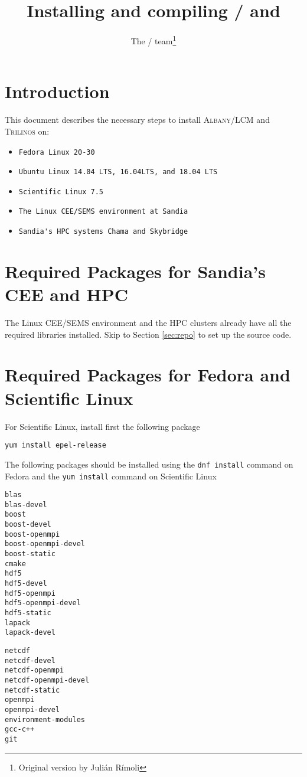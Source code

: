 \documentclass{article}
\title{Installing and compiling \albany{}/\lcm{} and
  \trilinos{}}
\author{The \albany{}/\lcm{} team\thanks{Original version by Juli\'an
    R\'imoli}}
\newcommand{\trilinos}{\textsc{Trilinos}}
\newcommand{\albany}{\textsc{Albany}}
\newcommand{\lcm}{\textsc{LCM}}
\begin{document}
\maketitle

\section{Introduction}
This document describes the necessary steps to install \albany{}/\lcm{} and
\trilinos{} on:
\begin{itemize}
\item \verb+Fedora Linux 20-30+
\item \verb+Ubuntu Linux 14.04 LTS, 16.04LTS, and 18.04 LTS+
\item \verb+Scientific Linux 7.5+
\item \verb+The Linux CEE/SEMS environment at Sandia+
\item \verb+Sandia's HPC systems Chama and Skybridge+
\end{itemize}

\section{Required Packages for Sandia's CEE and HPC}
The Linux CEE/SEMS environment and the HPC clusters already have all the
required libraries installed. Skip to Section \ref{sec:repo} to set up the
source code.

\section{Required Packages for Fedora and Scientific Linux}
For Scientific Linux, install first the following package
\begin{verbatim}
yum install epel-release
\end{verbatim}
The following packages should be installed using the \verb+dnf install+ command
on Fedora and the \verb+yum install+ command on Scientific Linux
\begin{verbatim}
blas
blas-devel
boost
boost-devel
boost-openmpi
boost-openmpi-devel
boost-static
cmake
hdf5
hdf5-devel
hdf5-openmpi
hdf5-openmpi-devel
hdf5-static
lapack
lapack-devel
\end{verbatim}

\begin{verbatim}
netcdf
netcdf-devel
netcdf-openmpi
netcdf-openmpi-devel
netcdf-static
openmpi
openmpi-devel
environment-modules
gcc-c++
git
\end{verbatim}
\end{document}
